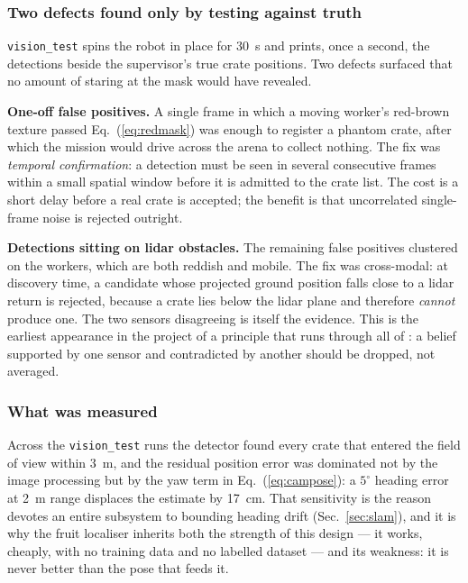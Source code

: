 \subsubsection{Two defects found only by testing against truth}

\texttt{vision\_test} spins the robot in place for \SI{30}{s} and prints,
once a second, the detections beside the supervisor's true crate
positions. Two defects surfaced that no amount of staring at the mask
would have revealed.

\textbf{One-off false positives.} A single frame in which a moving
worker's red-brown texture passed Eq.~(\ref{eq:redmask}) was enough to
register a phantom crate, after which the mission would drive across the
arena to collect nothing. The fix was \emph{temporal confirmation}: a
detection must be seen in several consecutive frames within a small
spatial window before it is admitted to the crate list. The cost is a
short delay before a real crate is accepted; the benefit is that
uncorrelated single-frame noise is rejected outright.

\textbf{Detections sitting on lidar obstacles.} The remaining false
positives clustered on the workers, which are both reddish and mobile.
The fix was cross-modal: at discovery time, a candidate whose projected
ground position falls close to a lidar return is rejected, because a
crate lies below the lidar plane and therefore \emph{cannot} produce
one. The two sensors disagreeing is itself the evidence. This is the
earliest appearance in the project of a principle that runs through all
of \phaseB{}: a belief supported by one sensor and contradicted by
another should be dropped, not averaged.



\subsubsection{What was measured}

Across the \texttt{vision\_test} runs the detector found every crate that
entered the field of view within \SI{3}{m}, and the residual position
error was dominated not by the image processing but by the yaw term in
Eq.~(\ref{eq:campose}): a $5^\circ$ heading error at \SI{2}{m} range
displaces the estimate by \SI{17}{cm}. That sensitivity is the reason
\phaseB{} devotes an entire subsystem to bounding heading drift
(Sec.~\ref{sec:slam}), and it is why the \phaseB{} fruit localiser
inherits both the strength of this design --- it works, cheaply, with no
training data and no labelled dataset --- and its weakness: it is never
better than the pose that feeds it.
